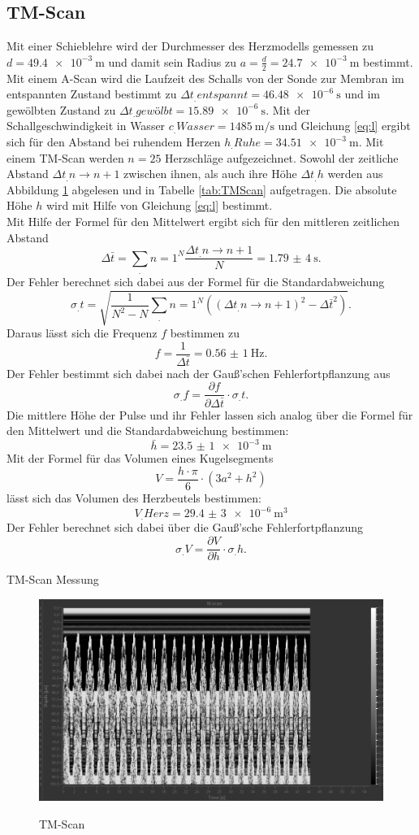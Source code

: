 \subsection{TM-Scan}
Mit einer Schieblehre wird der Durchmesser des Herzmodells gemessen zu $d=\SI{49,4e-3}{\metre}$ und damit sein Radius zu $a=\frac{d}{2}=\SI{24,7e-3}{\metre}$ bestimmt.
Mit einem A-Scan wird die Laufzeit des Schalls von der Sonde zur Membran im entspannten Zustand bestimmt zu $\Delta t_.{entspannt}= \SI{46,48e-6}{\second}$ und im gewölbten Zustand zu $\Delta t_.{gewölbt}= \SI{15,89e-6}{\second}$.\newline
Mit der Schallgeschwindigkeit in Wasser $c_.{Wasser}=\SI{1485}{\metre\per\second}$ und Gleichung \eqref{eq:l} ergibt sich für den Abstand bei ruhendem Herzen $h_.{Ruhe} = \SI{34,51e-3}{\metre}$.
Mit einem TM-Scan werden $n=25$ Herzschläge aufgezeichnet. Sowohl der zeitliche Abstand $\Delta t_.{n\rightarrow n+1}$ zwischen ihnen, als auch ihre Höhe $\Delta t_.h$ werden aus Abbildung \ref{fig:TM-Scan} abgelesen und in Tabelle \ref{tab:TMScan} aufgetragen.
Die absolute Höhe $h$ wird mit Hilfe von Gleichung \ref{eq:l} bestimmt.\\
Mit Hilfe der Formel für den Mittelwert ergibt sich für den mittleren zeitlichen Abstand
\[
\Delta\bar{t}= \sum_.{n=1}^N \frac{\Delta t_.{n\rightarrow n+1}}{N} = \SI{1,79(4)}{\second} \text{.}
\]
Der Fehler berechnet sich dabei aus der Formel für die Standardabweichung
\[
\sigma_.t=\sqrt{\frac{1}{N^2-N}\sum_.n=1^N ((\Delta t_.{n\rightarrow n+1})^2-\Delta\bar{t}^2)} \text{.}
\]
Daraus lässt sich die Frequenz $f$ bestimmen zu
\[
f=\frac{1}{\Delta\bar{t}}= \SI{0,56(1)}{\hertz} \text{.}
\]
Der Fehler bestimmt sich dabei nach der Gauß'schen Fehlerfortpflanzung aus
\[
\sigma_.f=\frac{\partial f}{\partial \Delta\bar{t}}\cdot \sigma_.t \text{.}
\]
Die mittlere Höhe der Pulse und ihr Fehler lassen sich analog über die Formel für den Mittelwert und die Standardabweichung bestimmen:
\[
\bar{h}=\SI{23,5(1)e-3}{\metre}
\]
Mit der Formel für das Volumen eines Kugelsegments
\[
V=\frac{h\cdot\pi}{6}\cdot\left(3a^2+h^2\right)
\]
lässt sich das Volumen des Herzbeutels bestimmen:
\[
V_.{Herz}=\SI{29,4(3)e-6}{\cubic\metre}
\]
Der Fehler berechnet sich dabei über die Gauß'sche Fehlerfortpflanzung
\[
\sigma_.V=\frac{\partial V}{\partial h}\cdot\sigma_.h \text{.}
\]

\begin{table}
	\centering
	\caption{TM-Scan Messung}
	
	\label{tab:TMScan}
\end{table}

\begin{figure}
	\centering
	\caption{TM-Scan}
	\includegraphics[width=\linewidth-40pt,height=\textheight-40pt,keepaspectratio]{content/images/TM-Scan.jpg}
	\label{fig:TM-Scan}
\end{figure}